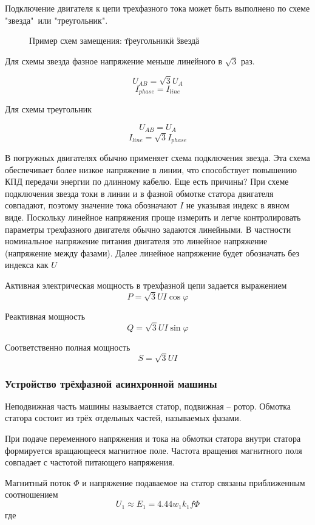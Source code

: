 Подключение двигателя к цепи трехфазного тока может быть выполнено по схеме "звезда"\ или "треугольник".

\begin{figure}[h!]
	\caption{Пример схем замещения: \"треугольник\" и \"звезда\"}
	\label{ris:electicity_triangle_star}
\end{figure}

Для схемы звезда фазное напряжение меньше линейного в $\sqrt{3}$ раз.

$$ U_{AB} = \sqrt{3} U_{A} $$
$$ I_{phase} = I_{line} $$

Для схемы треугольник 

$$ U_{AB} =  U_{A} $$
$$ I_{line} =\sqrt{3} I_{phase} $$


В погружных двигателях обычно применяет схема подключения звезда. Эта схема обеспечивает более низкое напряжение в линии, что способствует повышению КПД передачи энергии по длинному кабелю. Еще есть причины?
При схеме подключения звезда токи в линии и в фазной обмотке статора двигателя совпадают, поэтому значение тока обозначают $I$ не указывая индекс в явном виде. Поскольку линейное напряжения проще измерить и легче контролировать параметры трехфазного двигателя обычно задаются линейными. В частности номинальное напряжение питания двигателя это линейное напряжение (напряжение между фазами). Далее линейное напряжение будет обозначать без индекса как $U$

Активная электрическая мощность в трехфазной цепи задается выражением 
$$ P= \sqrt{3}U I \cos \varphi$$

Реактивная мощность 
$$ Q= \sqrt{3}U I \sin \varphi$$

Соответственно полная мощность 
$$ S= \sqrt{3}U I $$

\subsubsection{ Устройство трёхфазной асинхронной машины}
Неподвижная часть машины называется статор, подвижная – ротор. Обмотка статора состоит из трёх отдельных частей, называемых фазами.

При подаче переменного напряжения и тока на обмотки статора внутри статора формируется вращающееся магнитное поле. Частота вращения магнитного поля совпадает с частотой питающего напряжения. 

Магнитный поток $\Phi $ и напряжение подаваемое на статор связаны приближенным соотношением 
$$ U_1 \approx E_1 = 4.44 w_1 k_1 f \Phi $$
где 

